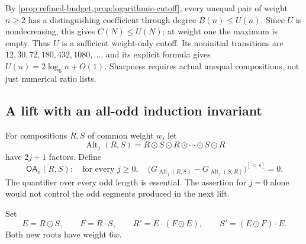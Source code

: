 \documentclass[11pt,a4paper]{amsart}
\numberwithin{equation}{section}
\theoremstyle{plain}
\theoremstyle{definition}
\newcommand{\Alt}{\operatorname{Alt}}
\newcommand{\OA}{\mathsf{OA}}
\begin{document}
By \cref{prop:refined-budget,prop:logarithmic-cutoff}, every unequal pair
of weight \(n\ge2\) has a distinguishing coefficient through degree
\(B(n)\le U(n)\).  Since \(U\) is nondecreasing, this gives
\(C(N)\le U(N)\); at weight one the maximum is empty.
Thus \(U\) is a sufficient weight-only cutoff.  Its noninitial transitions
are \(12,30,72,180,432,1080,\ldots\), and its explicit formula gives
\(U(n)=2\log_6 n+O(1)\).
Sharpness requires actual unequal compositions, not just numerical ratio lists.

\subsection{A lift with an all-odd induction invariant}
For compositions \(R,S\) of common weight \(w\), let
\[
\Alt_j(R,S)=R\odot S\odot R\odot\cdots\odot S\odot R
\]
have \(2j+1\) factors.  Define
\begin{equation}\label{eq:OA}
\OA_s(R,S):\quad
\text{for every }j\ge0,\quad
\bigl(G_{\Alt_j(R,S)}-G_{\Alt_j(S,R)}\bigr)^{[<s]}=0.
\end{equation}
The quantifier over every odd length is essential.  The assertion for
\(j=0\) alone would not control the odd segments produced in the next lift.

Set
\begin{equation}\label{eq:sharpness-lift}
E=R\odot S,\qquad F=R\cdot S,\qquad
R'=E\cdot(F\odot E),\qquad
S'=(E\odot F)\cdot E.
\end{equation}
Both new roots have weight \(6w\).
\end{document}

